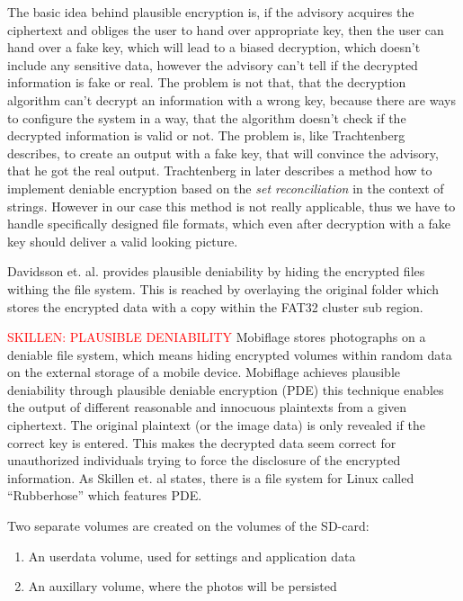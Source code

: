 \documentclass[12pt,a4paper,titlepage,oneside]{scrartcl}
\newcommand\todo[1]{\textcolor{red}{#1}}
\begin{document}
The basic idea behind plausible encryption is, if the advisory acquires the ciphertext and obliges the user to hand over appropriate key, then the user can hand over a fake key, which will lead to a biased decryption, which doesn't include any sensitive data, however the advisory can't tell if the decrypted information is fake or real. \cite{canetti1997deniable}
The problem is not that, that the decryption algorithm can't decrypt an information with a wrong key, because there are ways to configure the system in a way, that the algorithm doesn't check if the decrypted information is valid or not.
The problem is, like Trachtenberg describes, to create an output with a fake key, that will convince the advisory, that he got the real output. \cite{trachtenbergsay}
Trachtenberg in \cite{trachtenbergsay} later describes a method how to implement deniable encryption based on the \textit{set reconciliation} in the context of strings.
However in our case this method is not really applicable, thus we have to handle specifically designed file formats, which even after decryption with a fake key should deliver a valid looking picture.

Davidsson et. al. provides plausible deniability by hiding the encrypted files withing the file system.
This is reached by overlaying the original folder which stores the encrypted data with a copy within the FAT32 cluster sub region. \cite{Davidsson2016}

\todo{SKILLEN: PLAUSIBLE DENIABILITY}
Mobiflage stores photographs on a deniable file system, which means hiding encrypted volumes within random data on the external storage of a mobile device.
Mobiflage achieves plausible deniability through plausible deniable encryption (PDE) this technique enables the output of different reasonable and innocuous plaintexts from a given ciphertext.
The original plaintext (or the image data) is only revealed if the correct key is entered.
This makes the decrypted data seem correct for unauthorized individuals trying to force the disclosure of the encrypted information.
As Skillen et. al states, there is a file system for Linux called ``Rubberhose'' which features PDE.

Two separate volumes are created on the volumes of the SD-card:
\begin{enumerate}
  \item An userdata volume, used for settings and application data
  \item An auxillary volume, where the photos will be persisted
\end{enumerate}
\end{document}
